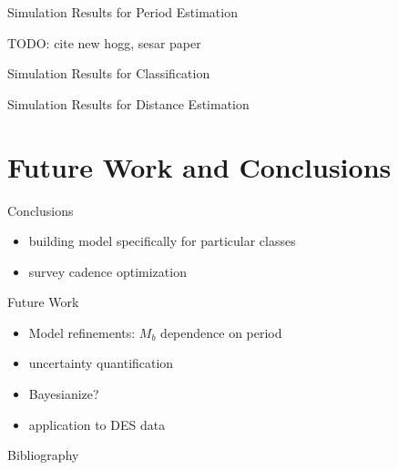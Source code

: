 \documentclass[12pt]{beamer}
\begin{document}
\begin{frame}{Simulation Results for Period Estimation}

TODO: cite new hogg, sesar paper
\end{frame}


\begin{frame}{Simulation Results for Classification}


\end{frame}


\begin{frame}{Simulation Results for Distance Estimation}


\end{frame}


\section{Future Work and Conclusions}

\begin{frame}{Conclusions}
\begin{itemize}
\item building model specifically for particular classes
\item survey cadence optimization
\end{itemize}
\end{frame}

\begin{frame}{Future Work}
\begin{itemize}
\item Model refinements: $M_b$ dependence on period
\item uncertainty quantification
\item Bayesianize?
\item application to DES data
\end{itemize}
\end{frame}

\begin{frame}[allowframebreaks]{Bibliography}
 
  \tiny{
  }
\end{frame}
\end{document}
